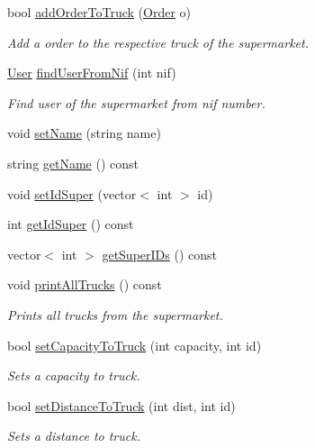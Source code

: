 \begin{DoxyCompactItemize}
bool \hyperlink{class_supermarket_a47b8391aece9861f2c59c0ada7c1ca13}{add\+Order\+To\+Truck} (\hyperlink{class_order}{Order} o)
\begin{DoxyCompactList}\small\item\em Add a order to the respective truck of the supermarket. \end{DoxyCompactList}\item 
\hyperlink{class_user}{User} \hyperlink{class_supermarket_ab900c1e7be95d28533e93dff117fc277}{find\+User\+From\+Nif} (int nif)
\begin{DoxyCompactList}\small\item\em Find user of the supermarket from nif number. \end{DoxyCompactList}\item 
void \hyperlink{class_supermarket_a4073d7d0b8aeb1d1dd585d2394e37394}{set\+Name} (string name)
\item 
string \hyperlink{class_supermarket_a917fbd070f9b9740a57d6baedbe57bde}{get\+Name} () const
\item 
void \hyperlink{class_supermarket_a51e31e345ce723c816739a98b8eea826}{set\+Id\+Super} (vector$<$ int $>$ id)
\item 
int \hyperlink{class_supermarket_a83e6d49d86781085d1dcfef8d48a26c1}{get\+Id\+Super} () const
\item 
vector$<$ int $>$ \hyperlink{class_supermarket_a0fdfd6a3d01f655a16a5297697852be6}{get\+Super\+I\+Ds} () const
\item 
\mbox{\label{class_supermarket_ab72f2f422efc910993f0e1a15e1ff114}} 
void \hyperlink{class_supermarket_ab72f2f422efc910993f0e1a15e1ff114}{print\+All\+Trucks} () const
\begin{DoxyCompactList}\small\item\em Prints all trucks from the supermarket. \end{DoxyCompactList}\item 
bool \hyperlink{class_supermarket_aa18f0ce05a8ce75b4ef2da141edb18d2}{set\+Capacity\+To\+Truck} (int capacity, int id)
\begin{DoxyCompactList}\small\item\em Sets a capacity to truck. \end{DoxyCompactList}\item 
bool \hyperlink{class_supermarket_a269aaf6964940e920d9706d0b433a47d}{set\+Distance\+To\+Truck} (int dist, int id)
\begin{DoxyCompactList}\small\item\em Sets a distance to truck. \end{DoxyCompactList}\item 

\end{DoxyCompactItemize}
